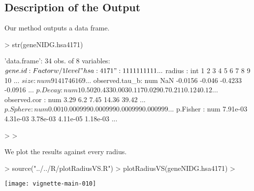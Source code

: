 \documentclass[11pt]{article}
\begin{document}
\subsection*{Description of the Output} %



Our method outputs a data frame. 


\begin{Schunk}
\begin{Sinput}
> str(geneNIDG.hsa4171)
\end{Sinput}
\begin{Soutput}
'data.frame':	34 obs. of  8 variables:
 $ gene.id       : Factor w/ 1 level "hsa:4171": 1 1 1 1 1 1 1 1 1 1 ...
 $ radius        : int  1 2 3 4 5 6 7 8 9 10 ...
 $ size          : num  9 14 17 46 169 ...
 $ observed.tau_b: num  NaN -0.0156 -0.046 -0.4233 -0.0916 ...
 $ p.Decay       : num  1 0.502 0.433 0.003 0.117 0.029 0.7 0.211 0.124 0.12 ...
 $ observed.cor  : num  3.29 6.2 7.45 14.36 39.42 ...
 $ p.Sphere      : num  0.001 0.000999 0.000999 0.000999 0.000999 ...
 $ p.Fisher      : num  7.91e-03 4.31e-03 3.78e-03 4.11e-05 1.18e-03 ...
\end{Soutput}
\begin{Sinput}
> 
> 
\end{Sinput}
\end{Schunk}


We plot the results against every radius.

\begin{Schunk}
\begin{Sinput}
> source("../../R/plotRadiusVS.R")
> plotRadiusVS(geneNIDG.hsa4171)
> 
\end{Sinput}
\end{Schunk}
\texttt{[image: vignette-main-010]}













\clearpage


\end{document}
